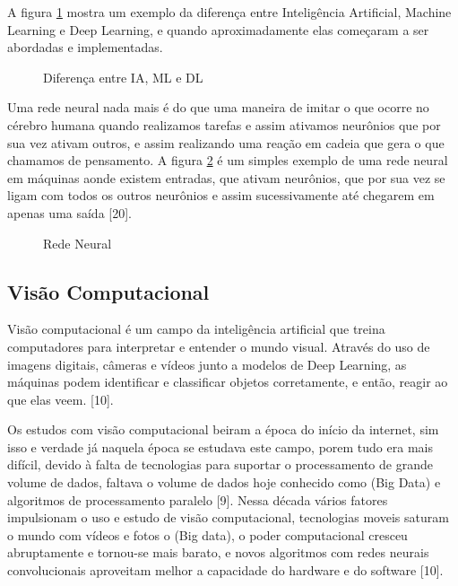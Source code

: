 A figura \ref{fig:iamldl} mostra um exemplo da diferença entre Inteligência Artificial, Machine Learning e Deep Learning, e quando aproximadamente elas começaram a ser abordadas e implementadas.

%
\begin{figure}[H]
	\centering
	\caption{Diferença entre IA, ML e DL}
	\def\svgwidth{15cm}
	
	\label{fig:iamldl}
\end{figure}

Uma rede neural nada mais é do que uma maneira de imitar o que ocorre no cérebro humana quando realizamos tarefas e assim ativamos neurônios que por sua vez ativam outros, e assim realizando uma reação em cadeia que gera o que chamamos de pensamento. A figura \ref{fig:neural} é um simples exemplo de uma rede neural em máquinas aonde existem entradas, que ativam neurônios, que por sua vez se ligam com todos os outros neurônios e assim sucessivamente até chegarem em apenas uma saída [20].

\begin{figure}[H]
	\centering
	\caption{Rede Neural}
	\def\svgwidth{15cm}
	
	\label{fig:neural}
\end{figure}

\subsection{Visão Computacional}
Visão computacional é um campo da inteligência artificial que treina computadores para interpretar e entender o mundo visual. Através do uso de imagens digitais, câmeras e vídeos junto a modelos de Deep Learning, as máquinas podem identificar e classificar objetos corretamente, e então, reagir ao que elas veem. [10].

Os estudos com visão computacional beiram a época do início da internet, sim isso e verdade já naquela época se estudava este campo, porem tudo era mais difícil, devido à falta de tecnologias para suportar o processamento de grande volume de dados, faltava o volume de dados hoje conhecido como (Big Data) e algoritmos de processamento paralelo [9]. Nessa década vários fatores impulsionam o uso e estudo de visão computacional, tecnologias moveis saturam o mundo com vídeos e fotos o (Big data), o poder computacional cresceu abruptamente e tornou-se mais barato, e novos algoritmos com redes neurais convolucionais aproveitam melhor a capacidade do hardware e do software [10].

